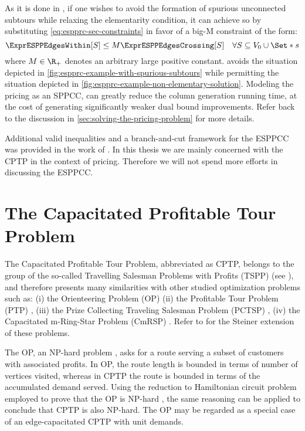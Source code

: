 As it is done in \textcite{beasley1989},
if one wishes to avoid the formation of spurious unconnected subtours
while relaxing the elementarity condition,
it can achieve so by substituting \cref{eq:espprc-sec-constraints} in favor
of a big-M constraint of the form:
\begin{equation}
	\label{eq:espprc-relaxed-elementarity}
	\ExprESPPEdgesWithin[S] \le M \ExprESPPEdgesCrossing[S] \quad \forall S \subseteq V_0 \cup \Set*{s}
\end{equation}
where $M \in \R_+$ denotes an arbitrary large positive constant.
 avoids the situation depicted
in \cref{fig:espprc-example-with-spurious-subtours}
while permitting the situation depicted in \cref{fig:espprc-example-non-elementary-solution}.
Modeling the pricing as an SPPCC, can greatly reduce
the column generation running time, at the cost
of generating significantly weaker dual bound improvements.
Refer back to the discussion in \cref{sec:solving-the-pricing-problem}
for more details.

Additional valid inequalities and a branch-and-cut framework
for the ESPPCC was provided in the work of \textcite{jepsen2008branchandcut}.
In this thesis we are mainly concerned with the CPTP in the context of pricing.
Therefore we will not spend more efforts in discussing the ESPPCC.

\section{The Capacitated Profitable Tour Problem}
\label{sec:the-capacitated-profitable-tour-problem}

The Capacitated Profitable Tour Problem, abbreviated as CPTP,
belongs to the group of the so-called
Travelling Salesman Problems with Profits (TSPP) (see \cite{feillet2005}),
and therefore presents many similarities with other
studied optimization problems such as:
(i) the Orienteering Problem (OP) \parencite{golden1987, laporte1990}
(ii) the Profitable Tour Problem (PTP) \parencite{dellamico1995},
(iii) the Prize Collecting Traveling Salesman Problem (PCTSP) \parencite{balas1989prize, balas1995prize},
(iv) the Capacitated m-Ring-Star Problem (CmRSP) \parencite{baldacci2007capacitated}.
Refer to \textcite{letchford2013} for the Steiner extension of these problems.

The OP, an NP-hard problem \parencite{laporte1990}, asks for a route serving
a subset of customers with associated profits.
In OP, the route length is bounded in terms of number of vertices visited,
whereas in CPTP the route is bounded in terms of the accumulated demand served.
Using the reduction to Hamiltonian circuit problem
employed to prove that the OP is NP-hard \parencite{laporte1990},
the same reasoning can be applied to conclude that CPTP is also NP-hard.
The OP may be regarded as a special case of an edge-capacitated CPTP with unit demands.

